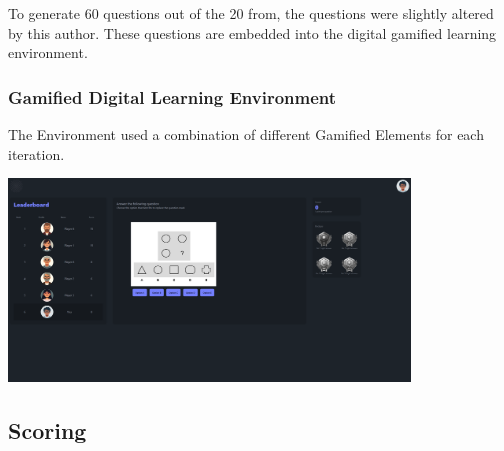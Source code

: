 To generate 60 questions out of the 20 from\textcite{albuquerqueDoesGenderStereotype2017}, the questions were slightly altered by this author.
These questions are embedded into the digital gamified learning environment.
\subsubsection{Gamified Digital Learning Environment}
The Environment used a combination of different Gamified Elements for each iteration.
\begin{minipage}{\textwidth}
    \includegraphics[width=0.8\textwidth]{img/question_screen.png}
    \label{fig:figureScreen}
  \end{minipage}
  
\subsection{Scoring}